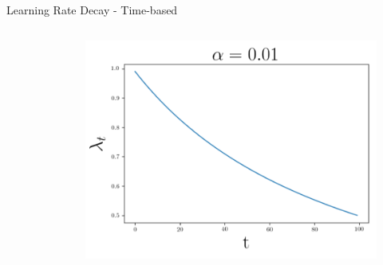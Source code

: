 \documentclass{beamer}
\begin{document}
\begin{frame}
\begin{block}{Learning Rate Decay - Time-based}
\begin{columns}
\begin{column}{0.3 \textwidth}
\begin{figure}
					\end{figure}
				\end{column}
				\begin{column}{0.3 \textwidth}
					\begin{figure}
						\centering
						\includegraphics[width=1\linewidth]{figures/lr_decay3.png}
					\end{figure}
				\end{column}
			\end{columns}
		\end{block}
	\end{frame}	
\end{document}
